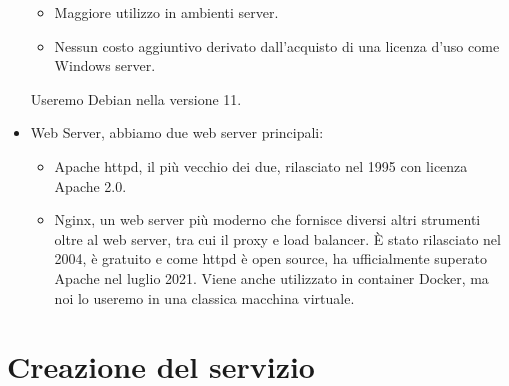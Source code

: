 \begin{itemize}
\begin{itemize}
        \item Maggiore utilizzo in ambienti server.
        \item Nessun costo aggiuntivo derivato dall'acquisto di una licenza d'uso come Windows server.
    \end{itemize}
    Useremo Debian nella versione 11.
    \item Web Server, abbiamo due web server principali:
    \begin{itemize}
        \item Apache httpd, il più vecchio dei due, rilasciato nel 1995 con licenza Apache 2.0.
        \item Nginx, un web server più moderno che fornisce diversi altri strumenti oltre al web server, tra cui il proxy e load balancer. È stato rilasciato nel 2004, è gratuito e come httpd è open source, ha ufficialmente superato Apache nel luglio 2021\cite{WebServerHistory}. Viene anche utilizzato in container Docker, ma noi lo useremo in una classica macchina virtuale.
    \end{itemize}
\end{itemize}

\newpage
\section{Creazione del servizio}

